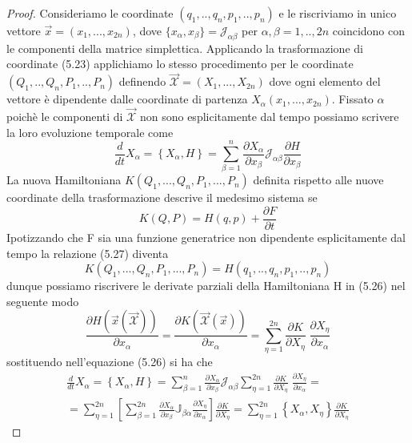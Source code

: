 \begin{proof}
Consideriamo le coordinate $(q_1,..,q_n,p_1,..,p_n)$ e le riscriviamo in unico vettore $\vec{x} = (x_1,...,x_{2n})$, dove $\{ x_{\alpha},x_{\beta} \} = \mathcal{J}_{\alpha \beta}$ per $\alpha,\beta =1,..,2n$ coincidono con le componenti della matrice simplettica. Applicando la trasformazione di coordinate (5.23) applichiamo lo stesso procedimento per le coordinate $(Q_1,..,Q_n,P_1,..,P_n)$ definendo $\vec{\mathcal{X}}=(X_1,...,X_{2n})$ dove ogni elemento del vettore \`{e} dipendente dalle coordinate di partenza $X_{\alpha}(x_1,...,x_{2n})$. Fissato $\alpha$ poich\`{e} le componenti di $\vec{\mathcal{X}}$ non sono esplicitamente dal tempo possiamo scrivere la loro evoluzione temporale come
\begin{equation}
\frac{d}{d t} X_\alpha=\left\{X_\alpha, H\right\}=\sum_{\beta=1}^n \frac{\partial X_\alpha}{\partial x_\beta} \mathcal{J}_{\alpha \beta} \frac{\partial H}{\partial x_\beta}
\end{equation}
La nuova Hamiltoniana $K(Q_1,...,Q_n,P_1,...,P_n)$ definita rispetto alle nuove coordinate della trasformazione descrive il medesimo sistema se 
\begin{equation}
K(Q, P)=H(q, p)+\frac{\partial F}{\partial t}
\end{equation}
Ipotizzando che F sia una funzione generatrice non dipendente esplicitamente dal tempo la relazione (5.27) diventa 
\begin{equation}
	K(Q_1,...,Q_n,P_1,...,P_n)=H(q_1,..,q_n,p_1,..,p_n)
\end{equation}
dunque possiamo riscrivere le derivate parziali della Hamiltoniana H in (5.26) nel seguente modo
\begin{equation}
	\frac{\partial H(\vec{x}(\vec{\mathcal{X}}))}{\partial x_{\alpha}} = \frac{\partial K(\vec{\mathcal{X}}(\vec{x}))}{\partial x_{\alpha}} = \sum_{\eta = 1}^{2n}\frac{\partial K}{\partial X_{\eta}}\;\frac{\partial X_{\eta}}{\partial x_{\alpha}}
\end{equation}
sostituendo nell'equazione (5.26) si ha che 
 \begin{align}
 	\frac{d}{d t} X_\alpha=\left\{X_\alpha, H\right\}=\sum_{\beta=1}^n \frac{\partial X_\alpha}{\partial x_\beta} \mathcal{J}_{\alpha \beta} \sum_{\eta = 1}^{2n}\frac{\partial K}{\partial X_{\eta}}\;\frac{\partial X_{\eta}}{\partial x_{\alpha}} = \\[0.1in]
 	= \sum_{\eta=1}^{2 n}\left[\sum_{\beta=1}^{2 n} \frac{\partial X_\alpha}{\partial x_\beta} \mathbb{J}_{\beta \alpha} \frac{\partial X_\eta}{\partial x_\alpha}\right] \frac{\partial K}{\partial X_\eta} = \sum_{\eta=1}^{2 n}\left\{X_{\alpha}, X_\eta\right\} \frac{\partial K}{\partial X_\eta}

\end{align}
\end{proof}
